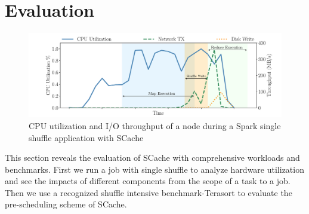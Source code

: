 \section{Evaluation}\label{evaluation}
\begin{figure}
	\includegraphics[width=\linewidth]{fig/scache_util}
	\caption{CPU utilization and I/O throughput of a node during a Spark single shuffle application with SCache}
	\label{fig:scache_util}
	\vspace{-1em}
\end{figure}
This section reveals the evaluation of SCache with comprehensive workloads and benchmarks. 
First we run a job with single shuffle to analyze hardware utilization and see the impacts of different components from the scope of a task to a job. 
Then we use a recognized shuffle intensive benchmark-Terasort \cite{spark-tera} to evaluate the pre-scheduling scheme of SCache. 
